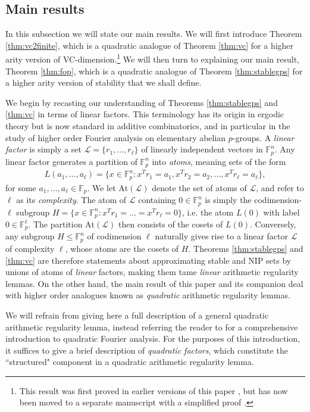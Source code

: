 \documentclass[12pt,oneside,british,a4wide]{amsart}
\numberwithin{equation}{section}
\theoremstyle{definition}
\def\F{\mathbb{F}}
\newcommand{\calL}{\mathcal{L}}
\newcommand{\At}{{\mathrm{At}}}
\begin{document}
\subsection{Main results}
In this subsection we will state our main results.  We will first introduce Theorem \ref{thm:vc2finite}, which is a quadratic analogue of Theorem \ref{thm:vc} for a higher arity version of VC-dimension.\footnote{   This result was first proved in earlier versions of this paper \cite{Terry.2021av2}, but has now been moved to a separate manuscript with a simplified proof \cite{Terry.2021d}.} We will then turn to explaining our main result, Theorem \ref{thm:fop}, which is a quadratic analogue of  Theorem \ref{thm:stablegps} for a higher arity version of stability that we shall define. 

We begin by recasting our understanding of Theorems \ref{thm:stablegps} and \ref{thm:vc} in terms of linear factors. This terminology has its origin in ergodic theory but is now standard in additive combinatorics, and in particular in the study of higher order Fourier analysis on elementary abelian $p$-groups. A \emph{linear factor} is simply a set $\calL=\{r_1,\ldots, r_{\ell}\}$ of linearly independent vectors in $\F_p^n$. Any linear factor generates a partition of $\F_p^n$ into \emph{atoms}, meaning sets of the form 
\begin{align}\label{linear}
L(a_1,\ldots, a_{\ell})=\{x \in \F_p^n: x^T r_1=a_1,x^T r_2=a_2,\dots, x^T r_\ell=a_\ell \},
\end{align}
for some $a_1,\ldots, a_{\ell}\in \F_p$.   We let $\At(\calL)$ denote the set of atoms of $\calL$, and refer to $\ell$ as its \emph{complexity}.  The atom of $\calL$ containing $0\in \F_p^n$ is simply the codimension-$\ell$ subgroup $H= \{x\in \F_p^n: x^Tr_1=\ldots =x^Tr_{\ell}=0\}$, i.e. the atom $L(0)$ with label $0\in \F_p^{\ell}$. The partition $\At(\calL)$ then consists of the cosets of $L(0)$.  Conversely, any subgroup $H\leqslant \F_p^n$ of codimension $\ell$ naturally gives rise to a linear factor $\calL$ of complexity $\ell$, whose atoms are the cosets of $H$.  Theorems \ref{thm:stablegps} and \ref{thm:vc} are therefore statements about approximating stable and NIP sets by unions of atoms of \emph{linear} factors, making them tame \emph{linear} arithmetic regularity lemmas. On the other hand, the main result of this paper and its companion \cite{Terry.2021d} deal with higher order analogues known as \emph{quadratic} arithmetic regularity lemmas.  
 
 We will refrain from giving here a full description of a general quadratic arithmetic regularity lemma, instead referring the reader to \cite[Section 2]{Terry.2021d} for a comprehensive introduction to quadratic Fourier analysis. For the purposes of this introduction, it suffices to give a brief description of \emph{quadratic factors}, which constitute the ``structured" component in a quadratic arithmetic regularity lemma.
\end{document}
